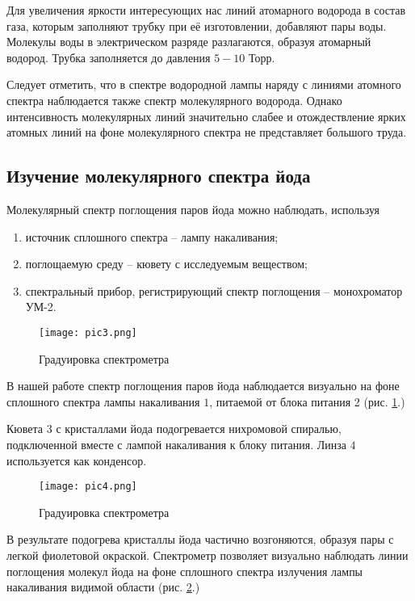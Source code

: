Для увеличения яркости интересующих нас линий атомарного водорода в состав газа,
которым заполняют трубку при её изготовлении, добавляют пары воды. Молекулы воды
в электрическом разряде разлагаются, образуя атомарный водород. Трубка
заполняется до давления $5-10$ Торр.

Следует отметить, что в спектре водородной лампы наряду с линиями атомного
спектра наблюдается также спектр молекулярного водорода. Однако интенсивность
молекулярных линий значительно слабее и отождествление ярких атомных линий на
фоне молекулярного спектра не представляет большого труда.

\subsection{Изучение молекулярного спектра йода}

Молекулярный спектр поглощения паров йода можно наблюдать, используя

\begin{enumerate}
  \item источник сплошного спектра -- лампу накаливания;
  \item поглощаемую среду -- кювету с исследуемым веществом;
  \item спектральный прибор, регистрирующий спектр поглощения -- монохроматор
  УМ-2.
\end{enumerate}

\begin{figure}[h!]
  \centering
  \texttt{[image: pic3.png]}
  \caption{Градуировка спектрометра}
  \label{pic3}
\end{figure}

В нашей работе спектр поглощения паров йода наблюдается визуально на фоне
сплошного спектра лампы накаливания $1$, питаемой от блока питания 2 (рис.
\ref{pic3}.)

Кювета $3$ с кристаллами йода подогревается нихромовой спиралью, подключенной
вместе с лампой накаливания к блоку питания. Линза $4$ используется как
конденсор.

\begin{figure}[h!]
  \centering
  \texttt{[image: pic4.png]}
  \caption{Градуировка спектрометра}
  \label{pic4}
\end{figure}

В результате подогрева кристаллы йода частично возгоняются, образуя пары с
легкой фиолетовой окраской. Спектрометр позволяет визуально наблюдать линии
поглощения молекул йода на фоне сплошного спектра излучения лампы накаливания
видимой области (рис. \ref{pic4}.)
